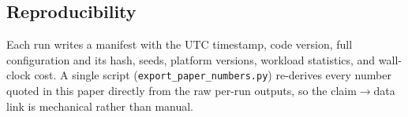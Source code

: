 \subsection{Reproducibility}
Each run writes a manifest with the UTC timestamp, code version, full configuration and its hash,
seeds, platform versions, workload statistics, and wall-clock cost. A single script
(\texttt{export\_paper\_numbers.py}) re-derives every number quoted in this paper directly from
the raw per-run outputs, so the claim$\rightarrow$data link is mechanical rather than
manual.
